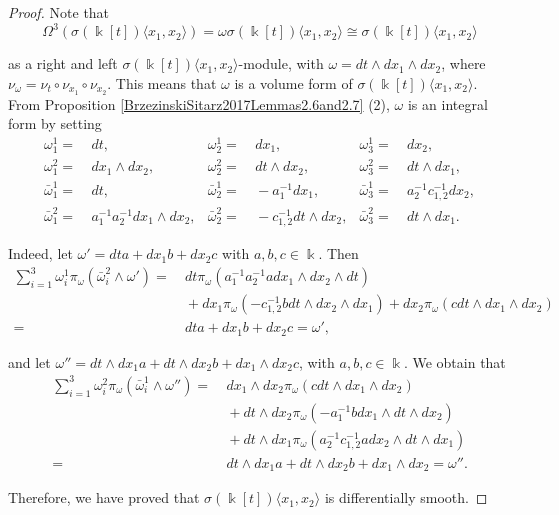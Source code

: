\documentclass{amsart}
\theoremstyle{definition}
\theoremstyle{remark}
\numberwithin{equation}{section}
\begin{document}
\begin{proof}
Note that 
\[
\Omega^3(\sigma(\Bbbk[t])\langle x_1,x_2\rangle) = \omega\sigma(\Bbbk[t])\langle x_1,x_2\rangle\cong \sigma(\Bbbk[t])\langle x_1,x_2\rangle
\]

as a right and left $\sigma(\Bbbk[t])\langle x_1,x_2\rangle$-module, with $\omega = dt\wedge dx_1 \wedge dx_2$, where $\nu_{\omega}=\nu_t\circ\nu_{x_1}\circ\nu_{x_2}$. This means that $\omega$ is a volume form of $\sigma(\Bbbk[t])\langle x_1,x_2\rangle$. From Proposition \ref{BrzezinskiSitarz2017Lemmas2.6and2.7} (2), $\omega$ is an integral form by setting
\begin{align*}
    \omega_1^1  = &\ dt,    & \omega_2^1 = &\ dx_1, & \omega_3^1  = &\ dx_2, \\
    \omega_1^2 = &\ dx_1\wedge dx_2, & \omega_2^2 = &\ dt\wedge dx_2, & \omega_3^2 = &\ dt\wedge dx_1, \\
    \bar{\omega}_1^1  = &\ dt,   &  \bar{\omega}_2^1= &\ -a_1^{-1}dx_1, &  \bar{\omega}_3^1= &\ a_2^{-1}c_{1,2}^{-1}dx_2, \\
    \bar{\omega}_1^2 = &\ a_1^{-1}a_2^{-1}dx_1\wedge dx_2 , & \bar{\omega}_2^2 = &\ -c_{1,2}^{-1}dt\wedge dx_2, & \bar{\omega}_3^2 = &\ dt\wedge dx_1.
\end{align*}

Indeed, let $\omega' = dta+dx_1b+dx_2c$ with $a,b,c \in \Bbbk$. Then 
\begin{align*}
\sum_{i=1}^{3}\omega_{i}^{1}\pi_{\omega}(\bar{\omega}_i^{2}\wedge \omega') = &\ dt\pi_{\omega}(a_1^{-1}a_2^{-1}adx_1\wedge dx_2\wedge dt)\\
&\ + dx_1\pi_{\omega}(-c_{1,2}^{-1}bdt\wedge dx_2\wedge dx_1)  + dx_2\pi_{\omega}(cdt\wedge dx_1\wedge dx_2) \\
= &\ dt a+dx_1 b + dx_2 c=\omega',
\end{align*}

and let $\omega'' = dt\wedge dx_1a+dt\wedge dx_2 b+dx_1\wedge dx_2 c$, with $a, b, c \in \Bbbk$. We obtain that
\begin{align*}
\sum_{i=1}^{3}\omega_{i}^{2}\pi_{\omega}(\bar{\omega}_i^{1}\wedge \omega'') = &\ dx_1\wedge dx_2\pi_{\omega}(cdt\wedge dx_1 \wedge dx_2) \\
    &\ +dt\wedge dx_2\pi_{\omega}(-a_{1}^{-1}bdx_1\wedge dt\wedge dx_2) \\
    &\ + dt\wedge dx_1\pi_{\omega}(a_{2}^{-1}c_{1,2}^{-1}adx_2 \wedge dt \wedge dx_1) \\
    = &\ dt\wedge dx_1a+dt\wedge dx_2b+dx_1\wedge dx_2= \omega''.
\end{align*}

Therefore, we have proved that $\sigma(\Bbbk[t])\langle x_1,x_2\rangle$ is differentially smooth.
\end{proof}
\end{document}
